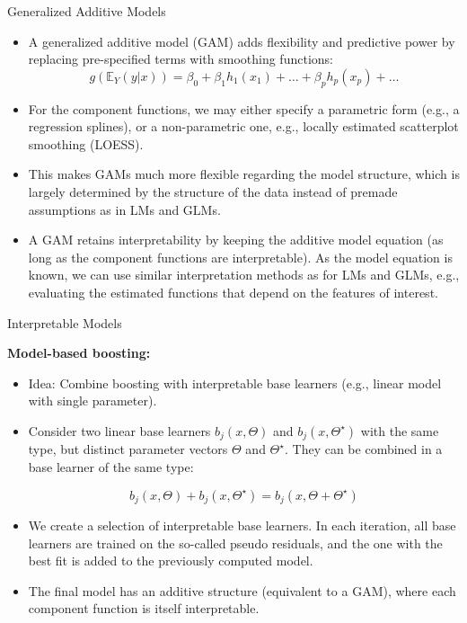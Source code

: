 \documentclass[11pt,compress,t,notes=noshow, xcolor=table]{beamer}
\begin{document}
\begin{vbframe}{Generalized Additive Models}

\begin{itemize}
\item A generalized additive model (GAM) adds flexibility and predictive power by replacing pre-specified terms with smoothing functions:
$$
g\left(\mathbb{E}_Y(y \vert x)\right) = \beta_0 + \beta_1 h_1(x_1) + \dots + \beta_p h_p(x_p) + \dots
$$
\item For the component functions, we may either specify a parametric form (e.g., a regression splines), or a non-parametric one, e.g., locally estimated scatterplot smoothing (LOESS).
\item This makes GAMs much more flexible regarding the model structure, which is largely determined by the structure of the data instead of premade assumptions as in LMs and GLMs.
\item A GAM retains interpretability by keeping the additive model equation (as long as the component functions are interpretable). As the model equation is known, we can use similar interpretation methods as for LMs and GLMs, e.g., evaluating the estimated functions that depend on the features of interest.
\end{itemize}


\end{vbframe}


\begin{vbframe}{Interpretable Models}


\textbf{Model-based boosting:}

\begin{itemize}

\item 
Idea: Combine boosting with interpretable base learners (e.g., linear model with single parameter).
\item
Consider two linear base learners $b_j(x, \Theta)$ and $b_j(x, \Theta^{\star})$ with the same type, but distinct parameter vectors $\Theta$ and $\Theta^{\star}$. They can be combined in a base learner of the same type:

$$
b_j(x, \Theta) + b_j(x, \Theta^{\star}) = b_j(x, \Theta + \Theta^{\star})
$$
\item We create a selection of interpretable base learners. In each iteration, all base learners are trained on the so-called pseudo residuals, and the one with the best fit is added to the previously computed model.
\item The final model has an additive structure (equivalent to a GAM), where each component function is itself interpretable.
\end{itemize}



\end{vbframe}
\end{document}
